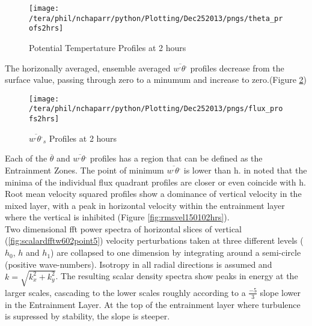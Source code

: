 \begin{figure}[htbp]
    \centering
    \texttt{[image: /tera/phil/nchaparr/python/Plotting/Dec252013/pngs/theta\_profs2hrs]}
    \caption{Potential Tempertature Profiles at 2 hours}
    \label{fig:pottempprofs2hrs}   %
\end{figure}


The horizonally averaged, ensemble averaged $\overline{w^{,}\theta^{,}}$ profiles decrease from the surface value, passing through zero to a minumum and increase to zero.(Figure \ref{fig:fluxprofs2hrs})\\

\begin{figure}[htbp]
    \centering
    \texttt{[image: /tera/phil/nchaparr/python/Plotting/Dec252013/pngs/flux\_profs2hrs]}
    \caption{$\overline{w^{,}\theta^{,}}_{s}$ Profiles at 2 hours}
    \label{fig:fluxprofs2hrs}   %
\end{figure}

Each of the $\overline{\theta}$ and $\overline{w^{,}\theta^{,}}$ profiles has a region that can be defined as the Entrainment Zones.  The point of minimum $\overline{w^{,}\theta^{,}}$
is lower than h.  \citeauthor{SullMoengStev} in \cite{SullMoengStev} noted that the minima of the individual flux quadrant profiles are closer or even coincide with h.\\

Root mean velocity squared profiles show a dominance of vertical velocity in the mixed layer, with a peak in horizontal velocity within the entrainment layer where the vertical is inhibited (Figure \ref{fig:rmsvel150102hrs}). \\

Two dimensional fft power spectra of horizontal slices of vertical (\ref{fig:scalardfftw602point5}) velocity perturbations taken at three
different levels ($h_{0}$, $h$ and $h_{1}$) are collapsed to one dimension by integrating around a semi-circle (positive wave-numbers).
Isotropy in all radial directions is assumed and $k = \sqrt{k_{x}^{2} + k_{y}^{2}}$.  The resulting scalar density spectra show peaks in 
energy at the larger scales, cascading to the lower scales roughly according to a $\frac{-5}{3}$ slope lower in the Entrainment Layer.  At
the top of the entrainment layer where turbulence is supressed by stability, the slope is steeper.


